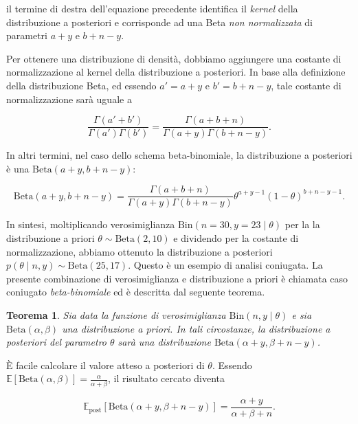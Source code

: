 \documentclass[
  11pt,
]{krantz}
\newcommand{\E}{\mathbb{E}} %
\newtheorem{theorem}{Teorema}[chapter]
\theoremstyle{definition}
\theoremstyle{definition}
\theoremstyle{definition}
\theoremstyle{definition}
\theoremstyle{remark}
\begin{document}
il termine di destra dell'equazione precedente identifica il \emph{kernel} della distribuzione a posteriori e corrisponde ad una Beta \emph{non normalizzata} di parametri \(a + y\) e \(b + n - y\).

Per ottenere una distribuzione di densità, dobbiamo aggiungere una costante di normalizzazione al kernel della distribuzione a posteriori. In base alla definizione della distribuzione Beta, ed essendo \(a' = a+y\) e \(b' = b+n-y\), tale costante di normalizzazione sarà uguale a

\[
\frac{\Gamma(a'+b')}{\Gamma(a')\Gamma(b')} = \frac{\Gamma(a+b+n)}{\Gamma(a+y)\Gamma(b+n-y)}.
\]

In altri termini, nel caso dello schema beta-binomiale, la distribuzione a posteriori è una \(\mbox{Beta}(a+y, b+n-y)\):

\[
\mbox{Beta}(a+y, b+n-y) = \frac{\Gamma(a+b+n)}{\Gamma(a+y)\Gamma(b+n-y)} \theta^{a+y-1}(1-\theta)^{b+n-y-1}.
\]

In sintesi, moltiplicando verosimiglianza \(\mbox{Bin}(n = 30, y = 23 \mid \theta)\) per la la distribuzione a priori \(\theta \sim \mbox{Beta}(2, 10)\) e dividendo per la costante di normalizzazione, abbiamo ottenuto la distribuzione a posteriori \(p(\theta \mid n, y) \sim \mbox{Beta}(25, 17)\). Questo è un esempio di analisi coniugata. La presente combinazione di verosimiglianza e distribuzione a priori è chiamata caso coniugato \emph{beta-binomiale} ed è descritta dal seguente teorema.

\begin{theorem}
\protect\hypertarget{thm:post-beta-bin-1}{}\label{thm:post-beta-bin-1}Sia data la funzione di verosimiglianza \(\mbox{Bin}(n, y \mid \theta)\) e sia \(\mbox{Beta}(\alpha, \beta)\) una distribuzione a priori. In tali circostanze, la distribuzione a posteriori del parametro \(\theta\) sarà una distribuzione \(\mbox{Beta}(\alpha + y, \beta + n - y)\).
\end{theorem}

È facile calcolare il valore atteso a posteriori di \(\theta\). Essendo \(\E[\mbox{Beta}(\alpha, \beta)] = \frac{\alpha}{\alpha + \beta}\), il risultato cercato diventa

\begin{equation}
\E_{\text{post}} [\mathrm{Beta}(\alpha + y, \beta + n - y)] = \frac{\alpha + y}{\alpha + \beta +n}.
\label{eq:ev-post-beta-bin-1}
\end{equation}
\end{document}
